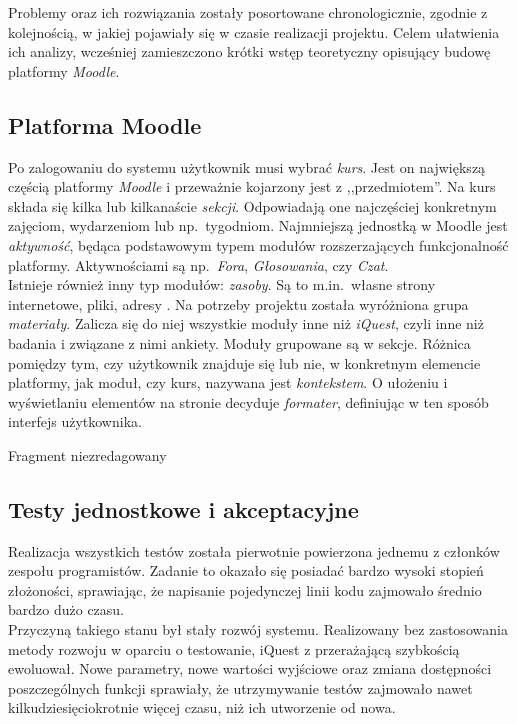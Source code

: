 Problemy oraz ich rozwiązania zostały posortowane chronologicznie, zgodnie z kolejnością, w jakiej pojawiały się w czasie realizacji projektu. Celem ułatwienia ich analizy, wcześniej zamieszczono krótki wstęp teoretyczny opisujący budowę platformy \textit{Moodle}.

\subsection{Platforma Moodle}
\label{Chapter622}

Po zalogowaniu do systemu użytkownik musi wybrać \textit{kurs}. Jest on największą częścią platformy \textit{Moodle} i przeważnie kojarzony jest z ,,przedmiotem''. Na kurs składa się kilka lub kilkanaście \textit{sekcji}. Odpowiadają one najczęściej konkretnym zajęciom, wydarzeniom lub np.~tygodniom. Najmniejszą jednostką w Moodle jest \textit{aktywność}, będąca podstawowym typem modułów rozszerzających funkcjonalność platformy. Aktywnościami są np.~\textit{Fora}, \textit{Głosowania}, czy \textit{Czat}. \\

Istnieje również inny typ modułów: \textit{zasoby}. Są to m.in.~własne strony internetowe, pliki, adresy . Na potrzeby projektu została wyróżniona grupa \textit{materiały}. Zalicza się do niej wszystkie moduły inne niż \textit{iQuest}, czyli inne niż badania i związane z nimi ankiety. Moduły grupowane są w sekcje. Różnica pomiędzy tym, czy użytkownik znajduje się lub nie, w konkretnym elemencie platformy, jak moduł, czy kurs, nazywana jest \textit{kontekstem}. O ułożeniu i wyświetlaniu elementów na stronie decyduje \textit{formater}, definiując w ten sposób interfejs użytkownika.




{\color{red}Fragment niezredagowany}

\subsection{Testy jednostkowe i akceptacyjne}
\label{Chapter 62b}

Realizacja wszystkich testów została pierwotnie powierzona jednemu z członków zespołu programistów. Zadanie to okazało się posiadać bardzo wysoki stopień złożoności, sprawiając, że napisanie pojedynczej linii kodu zajmowało średnio bardzo dużo czasu. \\

Przyczyną takiego stanu był stały rozwój systemu. Realizowany bez zastosowania metody rozwoju w oparciu o testowanie, iQuest z przerażającą szybkością ewoluował. Nowe parametry, nowe wartości wyjściowe oraz zmiana dostępności poszczególnych funkcji sprawiały, że utrzymywanie testów zajmowało nawet kilkudziesięciokrotnie więcej czasu, niż ich utworzenie od nowa. \\

